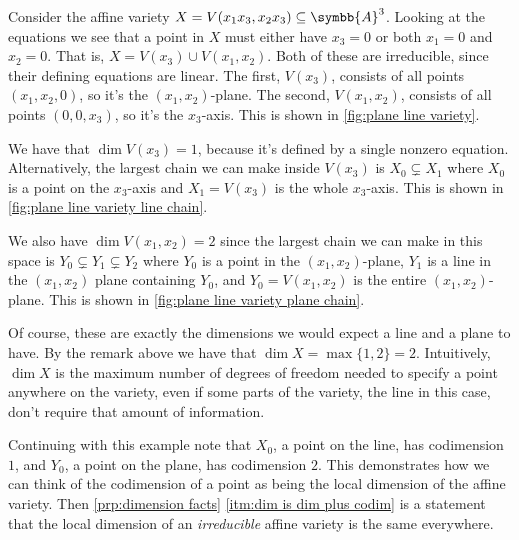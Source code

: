 \documentclass[fleqn]{NotesClass}
\newcommand{\affine}{\symbb{A}}
\begin{document}
    \begin{exm}{}{}
        Consider the affine variety \(X = V(x_1x_3, x_2x_3) \subseteq \affine^3\).
        Looking at the equations we see that a point in \(X\) must either have \(x_3 = 0\) or both \(x_1 = 0\) and \(x_2 = 0\).
        That is, \(X = V(x_3) \cup V(x_1, x_2)\).
        Both of these are irreducible, since their defining equations are linear.
        The first, \(V(x_3)\), consists of all points \((x_1, x_2, 0)\), so it's the \((x_1, x_2)\)-plane.
        The second, \(V(x_1, x_2)\), consists of all points \((0, 0, x_3)\), so it's the \(x_3\)-axis.
        This is shown in \cref{fig:plane line variety}.
        
        We have that \(\dim V(x_3) = 1\), because it's defined by a single nonzero equation.
        Alternatively, the largest chain we can make inside \(V(x_3)\) is \(X_0 \subsetneq X_1\) where \(X_0\) is a point on the \(x_3\)-axis and \(X_1 = V(x_3)\) is the whole \(x_3\)-axis.
        This is shown in \cref{fig:plane line variety line chain}.
        
        We also have \(\dim V(x_1, x_2) = 2\) since the largest chain we can make in this space is \(Y_0 \subsetneq Y_1 \subsetneq Y_2\) where \(Y_0\) is a point in the \((x_1, x_2)\)-plane, \(Y_1\) is a line in the \((x_1, x_2)\) plane containing \(Y_0\), and \(Y_0 = V(x_1, x_2)\) is the entire \((x_1, x_2)\)-plane.
        This is shown in \cref{fig:plane line variety plane chain}.
        
        Of course, these are exactly the dimensions we would expect a line and a plane to have.
        By the remark above we have that \(\dim X = \max\{1, 2\} = 2\).
        Intuitively, \(\dim X\) is the maximum number of degrees of freedom needed to specify a point anywhere on the variety, even if some parts of the variety, the line in this case, don't require that amount of information.
        
        Continuing with this example note that \(X_0\), a point on the line, has codimension \(1\), and \(Y_0\), a point on the plane, has codimension \(2\).
        This demonstrates how we can think of the codimension of a point as being the local dimension of the affine variety.
        Then \cref{prp:dimension facts} \cref{itm:dim is dim plus codim} is a statement that the local dimension of an \emph{irreducible} affine variety is the same everywhere.
    \end{exm}
    
\end{document}
